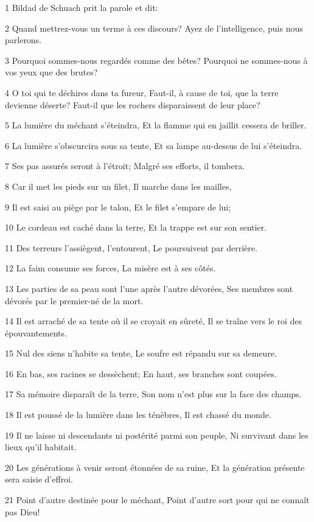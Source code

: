 \par 1 Bildad de Schuach prit la parole et dit:
\par 2 Quand mettrez-vous un terme à ces discours? Ayez de l'intelligence, puis nous parlerons.
\par 3 Pourquoi sommes-nous regardés comme des bêtes? Pourquoi ne sommes-nous à vos yeux que des brutes?
\par 4 O toi qui te déchires dans ta fureur, Faut-il, à cause de toi, que la terre devienne déserte? Faut-il que les rochers disparaissent de leur place?
\par 5 La lumière du méchant s'éteindra, Et la flamme qui en jaillit cessera de briller.
\par 6 La lumière s'obscurcira sous sa tente, Et sa lampe au-dessus de lui s'éteindra.
\par 7 Ses pas assurés seront à l'étroit; Malgré ses efforts, il tombera.
\par 8 Car il met les pieds sur un filet, Il marche dans les mailles,
\par 9 Il est saisi au piège par le talon, Et le filet s'empare de lui;
\par 10 Le cordeau est caché dans la terre, Et la trappe est sur son sentier.
\par 11 Des terreurs l'assiègent, l'entourent, Le poursuivent par derrière.
\par 12 La faim consume ses forces, La misère est à ses côtés.
\par 13 Les parties de sa peau sont l'une après l'autre dévorées, Ses membres sont dévorés par le premier-né de la mort.
\par 14 Il est arraché de sa tente où il se croyait en sûreté, Il se traîne vers le roi des épouvantements.
\par 15 Nul des siens n'habite sa tente, Le soufre est répandu sur sa demeure.
\par 16 En bas, ses racines se dessèchent; En haut, ses branches sont coupées.
\par 17 Sa mémoire disparaît de la terre, Son nom n'est plus sur la face des champs.
\par 18 Il est poussé de la lumière dans les ténèbres, Il est chassé du monde.
\par 19 Il ne laisse ni descendants ni postérité parmi son peuple, Ni survivant dans les lieux qu'il habitait.
\par 20 Les générations à venir seront étonnées de sa ruine, Et la génération présente sera saisie d'effroi.
\par 21 Point d'autre destinée pour le méchant, Point d'autre sort pour qui ne connaît pas Dieu!

